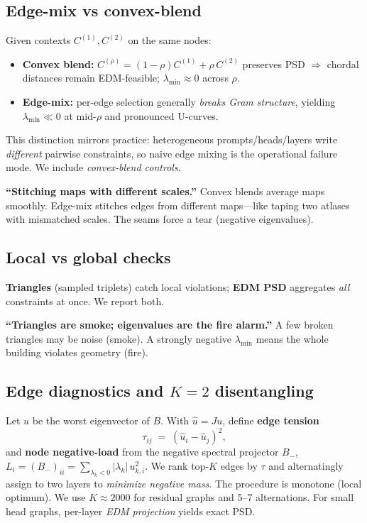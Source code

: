 \documentclass[11pt]{article}
\newcommand{\1}{\mathbf{1}}
\begin{document}
\subsection{Edge-mix vs convex-blend}\label{sec:mix}
Given contexts $C^{(1)},C^{(2)}$ on the same nodes:
\begin{itemize}[leftmargin=1.5em]
\item \textbf{Convex blend:} $C^{(\rho)}=(1-\rho)C^{(1)}+\rho\,C^{(2)}$ preserves PSD $\Rightarrow$ chordal distances remain EDM-feasible; $\lambda_{\min}\approx 0$ across $\rho$.
\item \textbf{Edge-mix:} per-edge selection generally \emph{breaks Gram structure}, yielding $\lambda_{\min}\ll 0$ at mid-$\rho$ and pronounced U-curves.
\end{itemize}
This distinction mirrors practice: heterogeneous prompts/heads/layers write \emph{different} pairwise constraints, so naive edge mixing is the operational failure mode. We include \emph{convex-blend controls}.

\begin{tcolorbox}[colback=blue!3,colframe=blue!40!black,title=Intuition (for \S\ref{sec:mix})]
\textbf{``Stitching maps with different scales.''} Convex blends average maps smoothly. Edge-mix stitches edges from different maps---like taping two atlases with mismatched scales. The seams force a tear (negative eigenvalues).
\end{tcolorbox}

\subsection{Local vs global checks}\label{sec:localglobal}
\textbf{Triangles} (sampled triplets) catch local violations; \textbf{EDM PSD} aggregates \emph{all} constraints at once. We report both.

\begin{tcolorbox}[colback=blue!3,colframe=blue!40!black,title=Intuition (for \S\ref{sec:localglobal})]
\textbf{``Triangles are smoke; eigenvalues are the fire alarm.''} A few broken triangles may be noise (smoke). A strongly negative $\lambda_{\min}$ means the whole building violates geometry (fire).
\end{tcolorbox}

\subsection{Edge diagnostics and $K{=}2$ disentangling}\label{sec:k2}
Let $u$ be the worst eigenvector of $B$. With $\hat u=Ju$, define \textbf{edge tension}
\[
\tau_{ij} \;=\; (\hat u_i-\hat u_j)^2,
\]
and \textbf{node negative-load} from the negative spectral projector $B_-$, $L_i=(B_-)_{ii}=\sum_{\lambda_k<0}|\lambda_k|\,u_{k,i}^2$.
We rank top-$K$ edges by $\tau$ and alternatingly assign to two layers to \emph{minimize negative mass}. The procedure is monotone (local optimum). We use $K\!\approx\!2000$ for residual graphs and 5--7 alternations. For small head graphs, per-layer \emph{EDM projection} yields exact PSD.
\end{document}

